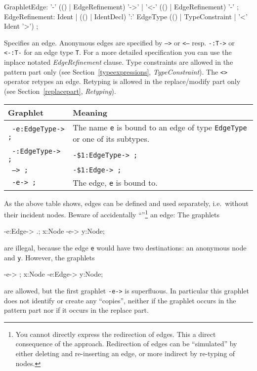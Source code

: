 \begin{rail}
  GraphletEdge: '-' (() | EdgeRefinement) '->'  | '<-' (() | EdgeRefinement) '-' ;
  EdgeRefinement: Ident | (() | IdentDecl) ':' EdgeType (() | TypeConstraint | '<' Ident '>') ;
\end{rail}
Specifies an edge. Anonymous edges are specified by \texttt{-->} or \texttt{<--} resp. \texttt{-:T->} or \texttt{<-:T-} for an edge type \texttt{T}. For a more detailed specification you can use the inplace notated \emph{EdgeRefinement} clause. Type constraints are allowed in the pattern part only (see Section~\ref{typeexpressions}, \emph{TypeConstraint}). The \texttt{<>} operator retypes an edge. Retyping is allowed in the replace/modify part only (see Section~\ref{replacepart}, \emph{Retyping}).\\
\begin{center}
  \begin{tabularx}{\linewidth}{lX}
    \textbf{Graphlet} & \textbf{Meaning}\\ \hline
    \texttt{ -e:EdgeType-> ;} & The name \texttt{e} is bound to an edge of type \texttt{EdgeType} or one of its subtypes. \\
    \texttt{ -:EdgeType-> ;} & \texttt{-\$1:EdgeType-> ;} \\
    \texttt{ --> ;} & \texttt{-\$1:Edge-> ;} \\
    \texttt{ -e-> ;} & The edge, \texttt{e} is bound to.
  \end{tabularx}
\end{center} 
As the above table shows, edges can be defined and used separately, i.e.\ without their incident nodes. Beware of accidentally ``''\footnote{You cannot directly express the redirection of edges. This a direct consequence of the  approach. Redirection of edges can be ``simulated'' by either deleting and re-inserting an edge, or more indirect by re-typing of nodes.} an edge: 
The graphlets
\begin{grgenlet}
-e:Edge-> .;
x:Node -e-> y:Node;
\end{grgenlet}
are illegal, because the edge \texttt{e} would have two destinations: an anonymous node and \texttt{y}.
However, the graphlets
\begin{grgenlet}
-e-> ;
x:Node -e:Edge-> y:Node;
\end{grgenlet}
are allowed, but the first graphlet \texttt{-e->} is superfluous. In particular this graphlet does not identify or create any ``copies'', neither if the graphlet occurs in the pattern part nor if it occurs in the replace part.
